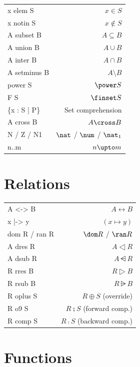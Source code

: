 \documentclass[10pt,landscape,a4paper]{article}
\begin{document}
\begin{multicols}{3}
\begin{tabularx}{\columnwidth}{LR}
x elem S             & $x \in S$ \\
x notin S            & $x \notin S$ \\
A subset B           & $A \subseteq B$ \\
A union B            & $A \cup B$ \\
A inter B            & $A \cap B$ \\
A setminus B         & $A \setminus B$ \\
power S              & $\power S$ \\
F S                  & $\finset S$ \\
\{x : S | P\}       & Set comprehension \\
A cross B            & $A \cross B$ \\
N / Z / N1           & $\nat$ / $\num$ / $\nat_1$ \\
n..m                 & $n \upto m$ \\
\end{tabularx}

\section{Relations}

\begin{tabularx}{\columnwidth}{LR}
A <-> B              & $A \rel B$ \\
x |-> y              & $(x \mapsto y)$ \\
dom R / ran R        & $\dom R$ / $\ran R$ \\
A dres R             & $A \dres R$ \\
A dsub R             & $A \ndres R$ \\
R rres B             & $R \rres B$ \\
R rsub B             & $R \nrres B$ \\
R oplus S            & $R \oplus S$ (override) \\
R o9 S               & $R \semi S$ (forward comp.) \\
R comp S             & $R \comp S$ (backward comp.) \\
\end{tabularx}

\section{Functions}


\end{multicols}
\end{document}
